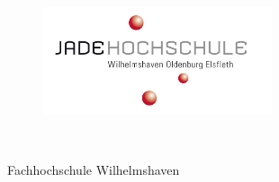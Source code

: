 


%


\thispagestyle{empty}

\begin{figure}[t]
 \centering
 \includegraphics[width=0.6\textwidth]{abb/fh_whv_big}
\end{figure}


\begin{verbatim}


\end{verbatim}

\begin{center}
\Large{Fachhochschule Wilhelmshaven}\\
\end{center}


